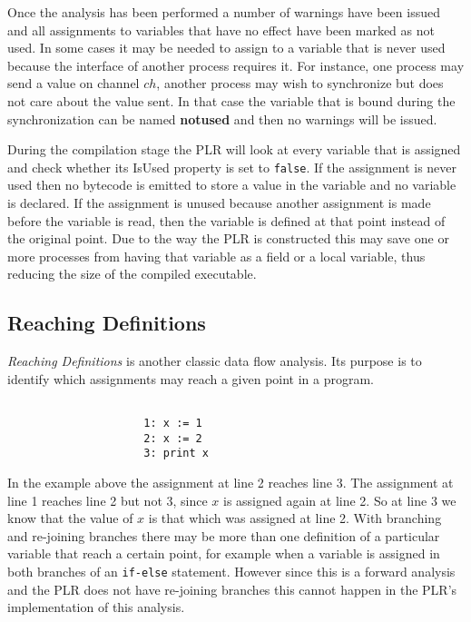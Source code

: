   Once the analysis has been performed a number of warnings have been issued 
  and all assignments to variables that have no effect have been marked as not 
  used. In some cases it may be needed to assign to a variable that is never 
  used because the interface of another process requires it. For instance, one 
  process may send a value on channel $ch$, another process may wish to 
  synchronize but does not care about the value sent. In that case the 
  variable that is bound during the synchronization can be named 
  \textbf{notused} and then no warnings will be issued.
  
  During the compilation stage the PLR will look at every variable that is 
  assigned and check whether its \textsf{IsUsed} property is set to 
  \texttt{false}. If the assignment is never used then no bytecode is emitted
  to store a value in the variable and no variable is declared. If the 
  assignment is unused because another assignment is made before the variable 
  is read, then the variable is defined at that point instead of the original 
  point. Due to the way the PLR is constructed this may save one or more
  processes from having that variable as a field or a local variable, thus
  reducing the size of the compiled executable.

\subsection{Reaching Definitions}\label{reaching_definitions}

  \textit{Reaching Definitions} is another classic data flow analysis. Its 
  purpose is to identify which assignments may reach a given point in a 
  program.
  
\begin{Exa}
	\label{ex:reaching_definition}
	\begin{verbatim}
	
                     1: x := 1
                     2: x := 2
                     3: print x
	\end{verbatim}
\end{Exa}  
	
	In the example above the assignment at line 2 reaches line 3. The assignment 
	at line 1 reaches line 2 but not 3, since $x$ is assigned again at line 2. 
	So at line 3 we know that the value of $x$ is that which was assigned at 
	line 2. With branching and re-joining branches there may be more than one 
	definition of a particular variable that reach a certain point, for example 
	when a variable is assigned in both branches of an \texttt{if-else} 
	statement. However since this is a forward analysis and the PLR does not 
	have re-joining branches this cannot happen in the PLR's implementation of 
	this analysis. 
	
